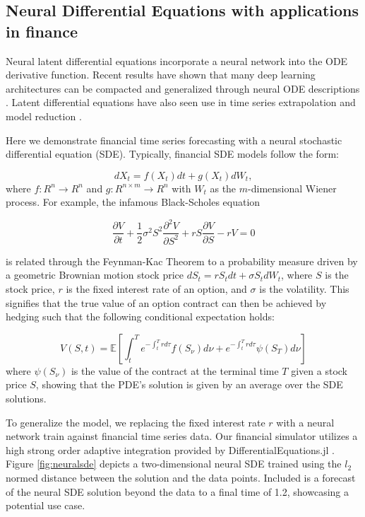 \documentclass{juliacon}
\begin{document}
\subsection{Neural Differential Equations with applications in finance}
\label{diffeq}

    Neural latent differential equations \cite{chen2018neural,pmlr-v5-alvarez09a,latent,DBLP:journals/corr/abs-1902-02376} incorporate a neural network into the ODE derivative function. Recent results have shown that many deep learning architectures can be compacted and generalized through neural ODE descriptions \cite{chen2018neural,He2016DeepRL,2019arXiv190401681D,DBLP:journals/corr/abs-1810-01367}. Latent differential equations have also seen use in time series extrapolation \cite{10.1093/bioinformatics/btn278} and model reduction \cite{ROMEROUGALDE2013170,8062736,2018arXiv180804930B,doi:10.1243/09544062JMES683}.

    Here we demonstrate financial time series forecasting with a neural stochastic differential equation (SDE). Typically, financial SDE models follow the form:

\[
    dX_t = f(X_t)dt + g(X_t)dW_t,
\]
    where
    $f:R^n \rightarrow R^n$ and $g:R^{n\times m} \rightarrow R^n$ with 
    $W_t$ as the $m$-dimensional Wiener process. For example, the infamous Black-Scholes equation

\[
    \frac{\partial V}{\partial t} + \frac{1}{2}\sigma^2 S^2 \frac{\partial^2 V}{\partial S^2} + rS\frac{\partial V}{\partial S} - rV = 0
\]

    is related through the Feynman-Kac Theorem to a probability measure driven by a geometric Brownian motion stock price $dS_t = r S_t dt + \sigma S_t dW_t$, where $S$ is the stock price, $r$ is the fixed interest rate of an option, and $\sigma$ is the volatility. This signifies that the true value of an option contract can then be achieved by hedging such that the following conditional expectation holds:

\[
    V(S,t) = \mathbb{E} \left[\int_t^T e^{-\int_t^T rd\tau}f(S_\nu)d\nu + e^{-\int_t^T rd\tau}\psi(S_T)d\nu    \right]
\]
    where $\psi(S_\nu)$ is the value of the contract at the terminal time $T$ given a stock price $S$, showing that the PDE's solution is given by an average over the SDE solutions. 

    To generalize the model, we replacing the fixed interest rate $r$ with a neural network train against financial time series data. Our financial simulator utilizes a high strong order adaptive integration provided by DifferentialEquations.jl \cite{DifferentialEquations.jl-2017,Rackauckas2017ADAPTIVEMF}.  Figure \ref{fig:neuralsde} depicts a two-dimensional neural SDE trained using the $l_2$ normed distance between the solution and the data points. Included is a forecast of the neural SDE solution beyond the data to a final time of 1.2, showcasing a potential use case.
\end{document}
